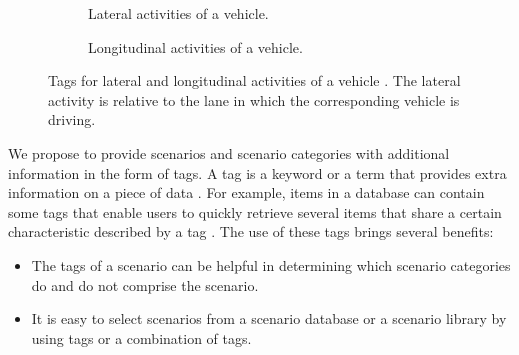 \begin{figure*}[t]
	\centering
	\begin{subfigure}{\linewidth}
		\centering
		\caption{Lateral activities of a vehicle.\vspace{1em}}
		\label{fig:tree vehicle lat act}
	\end{subfigure}
	\begin{subfigure}{\linewidth}
		\centering
		\caption{Longitudinal activities of a vehicle.}
		\label{fig:tree vehicle long act}
	\end{subfigure}
	\caption{Tags for lateral and longitudinal activities of a vehicle \autocite{degelder2019scenariocategories}. The lateral activity is relative to the lane in which the corresponding vehicle is driving.}
	\label{fig:tree vehicle activities}
\end{figure*}

We propose to provide scenarios and scenario categories with additional information in the form of tags.
A tag is a keyword or a term that provides extra information on a piece of data \autocite{smith2007tagging}. For example, items in a database can contain some tags that enable users to quickly retrieve several items that share a certain characteristic described by a tag \autocite{craft2004tagging}. 
The use of these tags brings several benefits:
\begin{itemize}
	\item The tags of a scenario can be helpful in determining which scenario categories do and do not comprise the scenario.
	\item It is easy to select scenarios from a scenario database or a scenario library by using tags or a combination of tags.
\end{itemize}

